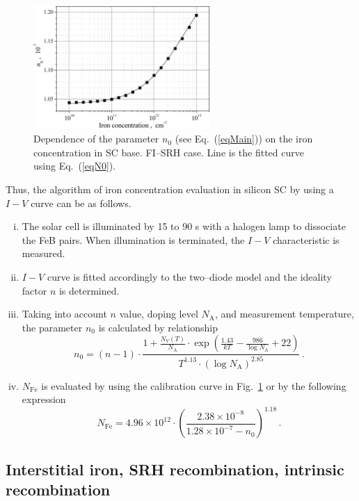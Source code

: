 \documentclass [sort&compress] {elsarticle}
\begin{document}
\begin{figure}
\includegraphics[width=0.6\textwidth]{Fig4}%
\caption{\label{fig4}
Dependence of the parameter $n_0$ (see Eq.~(\ref{eqMain})) on the iron concentration in SC base.
FI--SRH case.
Line is the fitted curve using Eq.~(\ref{eqN0}).
}%
\end{figure}

Thus, the algorithm of iron concentration evaluation in silicon SC by using a $I-V$ curve can be as follows.
\begin{enumerate}[(i)]
\item The solar cell is illuminated by 15 to 90 s with a halogen lamp to dissociate the FeB pairs.
      When illumination is terminated, the $I-V$ characteristic is measured.
\item $I-V$ curve is fitted accordingly to the two--diode model and the ideality factor $n$ is determined.
\item Taking into account $n$ value, doping level $N_\mathrm{A}$, and measurement temperature,
      the parameter $n_0$ is calculated by relationship
\begin{displaymath}
    n_0=(n-1)\cdot \frac{1+\frac{N_V(T)}{N_\mathrm{A}}\cdot\exp\left(\frac{1.43}{kT}-\frac{986}{\log N_\mathrm{A}}+22\right)}{T^{1.13}\cdot(\log N_\mathrm{A})^{2.85}}\,.
\end{displaymath}
\item $N_\mathrm{Fe}$ is evaluated by using the calibration curve in Fig.~\ref{fig4} or by the following expression
\begin{displaymath}
    N_\mathrm{Fe}=4.96\times10^{12}\cdot \left(\frac{2.38\times10^{-8}}{1.28\times10^{-7}-n_0}\right)^{1.18}\,.
\end{displaymath}
\end{enumerate}


\subsection{Interstitial iron, SRH recombination, intrinsic recombination}
\end{document}
